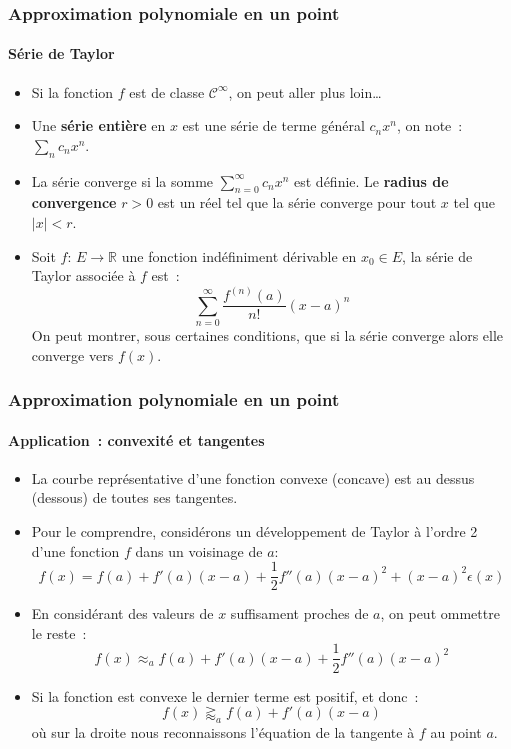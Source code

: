 \documentclass[10pt,notheorems]{beamer}
\theoremstyle{plain}
\theoremstyle{definition} %
\begin{document}
\begin{frame}
  \frametitle{Approximation polynomiale en un point}
  \framesubtitle{Série de Taylor}

  \bigskip

  \begin{itemize}

  \item Si la fonction $f$ est de classe $\mathcal C^{\infty}$, on peut aller plus loin\ldots\newline

  \item Une \textbf{série entière} en $x$ est une série de terme général $c_nx^n$, on note~: $\sum_n c_nx^n$.\newline

  \item La série converge si la somme $\sum_{n=0}^{\infty} c_nx^n$ est définie. Le \textbf{radius de convergence} $r>0$ est un réel tel que la série converge pour tout $x$ tel que $|x|<r$.\newline

  \item Soit $f:\, E\rightarrow \mathbb R$ une fonction indéfiniment dérivable en $x_0\in E$, la série de Taylor associée à $f$ est~:
    \[
      \sum_{n=0}^{\infty} \frac{f^{(n)}(a)}{n!}(x-a)^n
    \]
    On peut montrer, sous certaines conditions, que si la série converge alors elle converge vers $f(x)$.

  \end{itemize}

\end{frame}


\begin{frame}
  \frametitle{Approximation polynomiale en un point}
  \framesubtitle{Application~: convexité et tangentes}

  \bigskip

  \begin{itemize}

  \item La courbe représentative d'une fonction convexe (concave) est au dessus (dessous) de toutes ses tangentes.\newline

  \item Pour le comprendre, considérons un développement de Taylor à l'ordre 2 d'une fonction $f$ dans un voisinage de $a$:
    \[
      f(x) = f(a) +  f'(a)(x-a) + \frac{1}{2}f''(a)(x-a)^2 + (x-a)^2\epsilon(x)
    \]

  \item En considérant des valeurs de $x$ suffisament proches de $a$, on peut ommettre le reste~:
    \[
      f(x) \approx_a f(a) +  f'(a)(x-a) + \frac{1}{2}f''(a)(x-a)^2
    \]

  \item Si la fonction est convexe le dernier terme est positif, et donc~:
    \[
      f(x) \gtrapprox_a f(a) +  f'(a)(x-a)
    \]
    où sur la droite nous reconnaissons l'équation de la tangente à $f$ au point $a$.

  \end{itemize}

\end{frame}
\end{document}
